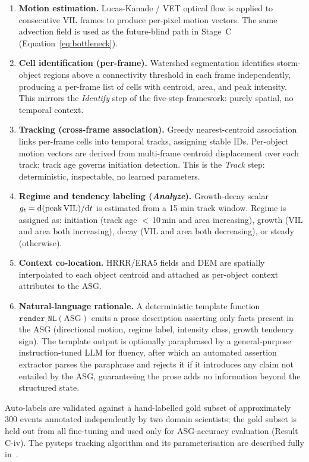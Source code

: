 \documentclass[fleqn,10pt]{wlscirep}
\begin{document}
\begin{enumerate}[leftmargin=*,nosep]
    \item \textbf{Motion estimation.} Lucas-Kanade / VET optical flow is applied to consecutive VIL frames to produce per-pixel motion vectors. The same advection field is used as the future-blind path in Stage~C (Equation~\ref{eq:bottleneck}).
    \item \textbf{Cell identification (per-frame).} Watershed segmentation identifies storm-object regions above a connectivity threshold in each frame independently, producing a per-frame list of cells with centroid, area, and peak intensity. This mirrors the \emph{Identify} step of the five-step framework: purely spatial, no temporal context.
    \item \textbf{Tracking (cross-frame association).} Greedy nearest-centroid association links per-frame cells into temporal tracks, assigning stable IDs. Per-object motion vectors are derived from multi-frame centroid displacement over each track; track age governs initiation detection. This is the \emph{Track} step: deterministic, inspectable, no learned parameters.
    \item \textbf{Regime and tendency labeling (\emph{Analyze}).} Growth-decay scalar $g_t = \mathrm{d}(\text{peak\,VIL})/\mathrm{d}t$ is estimated from a 15-min track window. Regime is assigned as: initiation (track age $<$\,10\,min and area increasing), growth (VIL and area both increasing), decay (VIL and area both decreasing), or steady (otherwise).
    \item \textbf{Context co-location.} HRRR/ERA5 fields and DEM are spatially interpolated to each object centroid and attached as per-object context attributes to the ASG.
    \item \textbf{Natural-language rationale.} A deterministic template function $\texttt{render\_NL}(\text{ASG})$ emits a prose description asserting only facts present in the ASG (directional motion, regime label, intensity class, growth tendency sign). The template output is optionally paraphrased by a general-purpose instruction-tuned LLM for fluency, after which an automated assertion extractor parses the paraphrase and rejects it if it introduces any claim not entailed by the ASG, guaranteeing the prose adds no information beyond the structured state.
\end{enumerate}

Auto-labels are validated against a hand-labelled gold subset of approximately 300 events annotated independently by two domain scientists; the gold subset is held out from all fine-tuning and used only for ASG-accuracy evaluation (Result C-iv).
The pysteps tracking algorithm and its parameterisation are described fully in~\cite{pulkkinen2019pysteps}.
\end{document}
